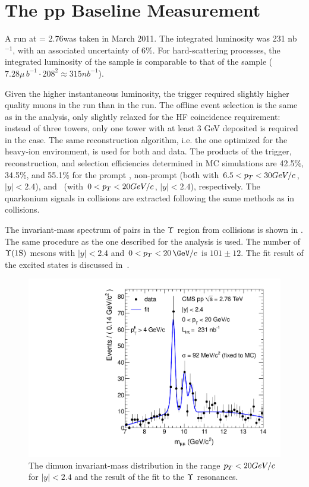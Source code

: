 \section{The pp Baseline Measurement}
\label{sec:ppRef}
A \pp run at \sqrts = 2.76\TeV was taken in March 2011. The integrated
luminosity was 231 nb$^{-1}$, with an associated uncertainty of 6\%. For
hard-scattering processes, the integrated luminosity of the \pp sample
is comparable to that of the \PbPb sample (\mbox{$7.28 \mu\,b^{-1} \cdot
208^2 \approx 315 nb^{-1}$}).

Given the higher instantaneous luminosity, the 
trigger required
slightly higher quality muons in the \pp run than in the \PbPb
run. The offline event selection is the same as in the \PbPb analysis,
only slightly relaxed for the HF coincidence requirement: instead of
three towers, only one tower with at least 3 GeV deposited is required
in the \pp case. The same reconstruction algorithm, i.e. the one
optimized for the heavy-ion environment, is used for both \pp and
\PbPb data. The products of the trigger, reconstruction, and selection
efficiencies determined in \pp MC simulations are 42.5\%, 34.5\%, and
55.1\% for the prompt \Jpsi, non-prompt \Jpsi (both with
$6.5<p_T<30GeV/c$, $|y|<2.4$), and \PgUa\ (with $0<p_T<20GeV/c$,
$|y|<2.4$), respectively.
The quarkonium signals in \pp collisions are extracted following the
same methods as in \PbPb collisions.

The invariant-mass spectrum of \mumu pairs in the $\Upsilon$ region from
\pp collisions is shown in . The same procedure as the
one described for the \PbPb analysis is used. The number of $\Upsilon\text{(1S)}$
mesons with $|y|<2.4$ and $0<\pt<20\,\GeV/c$ is $101\pm12$. The fit
result of the excited states is discussed in~\cite{Chatrchyan:2011pe}.

\begin{figure}[hbtp]
  \begin{center}
  \includegraphics[width=0.5\linewidth]{chap_YInPbPbColl2010_figures/masspeak_pp_HIrereco}
  \caption{The \pp dimuon invariant-mass distribution in the range
    $p_T<20 GeV/c$ for $|y|<2.4$ and the result of the fit to the
    $\Upsilon$ resonances.}
  \label{fig:ups_pp}
  \end{center}
\end{figure}


